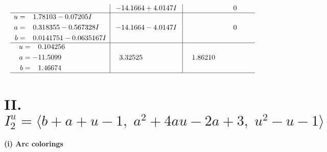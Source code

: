 \documentclass[1p]{elsarticle_modified}
\theoremstyle{definition}
\begin{document}
$$\begin{array}{c|c|c}
 & -14.1664 + 4.0147 I & \phantom{-0.000000 } 0 \\ \hline\begin{aligned}
u &= \phantom{-}1.78103 - 0.07205 I \\
a &= \phantom{-}0.318355 - 0.567328 I \\
b &= \phantom{-}0.0141751 - 0.0635167 I\end{aligned}
 & -14.1664 - 4.0147 I & \phantom{-0.000000 } 0 \\ \hline\begin{aligned}
u &= \phantom{-}0.104256\phantom{ +0.000000I} \\
a &= -11.5099\phantom{ +0.000000I} \\
b &= \phantom{-}1.46674\phantom{ +0.000000I}\end{aligned}
 & \phantom{-}3.32525\phantom{ +0.000000I} & \phantom{-}1.86210\phantom{ +0.000000I}\\
 \hline 
 \end{array}$$\newpage\newpage\renewcommand{\arraystretch}{1}
\centering \section*{II. $I^u_{2}= \langle b+a+u-1,\;a^2+4 a u-2 a+3,\;u^2- u-1 \rangle$}
\flushleft \textbf{(i) Arc colorings}\\
\end{document}

